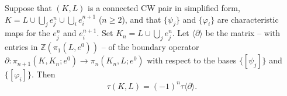 Suppose that $(K, L)$ is a connected CW pair in simplified form, $K = L \cup \bigcup_j e_j^n \cup \bigcup_i e_i^{n+1}$ ($n \geq 2$), and that $\{\psi_j\}$ and $\{\varphi_i\}$ are characteristic maps for the $e_j^n$ and $e_i^{n+1}$. Set $K_n = L \cup \bigcup_j e_j^n$. Let $\langle \partial \rangle$ be the matrix -- with entries in $\mathbb{Z}(\pi_1(L, e^0))$ -- of the boundary operator $\partial: \pi_{n+1}(K, K_n; e^0) \to \pi_n(K_n, L; e^0)$ with respect to the bases $\{[\psi_j]\}$ and $\{[\varphi_i]\}$. Then
$$\tau(K, L) = (-1)^n \tau\langle \partial \rangle.$$
